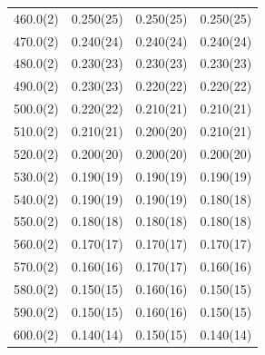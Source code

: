 \begin{longtable}{S[table-format=3.1(1)] S[table-format=3.3(3)] S[table-format=3.3(3)] S[table-format=3.3(3)]}
        460.0(2) & 0.250(25) & 0.250(25) & 0.250(25)\\ 
        470.0(2) & 0.240(24) & 0.240(24) & 0.240(24)\\ 
        480.0(2) & 0.230(23) & 0.230(23) & 0.230(23)\\ 
        490.0(2) & 0.230(23) & 0.220(22) & 0.220(22)\\ 
        500.0(2) & 0.220(22) & 0.210(21) & 0.210(21)\\ 
        510.0(2) & 0.210(21) & 0.200(20) & 0.210(21)\\ 
        520.0(2) & 0.200(20) & 0.200(20) & 0.200(20)\\ 
        530.0(2) & 0.190(19) & 0.190(19) & 0.190(19)\\ 
        540.0(2) & 0.190(19) & 0.190(19) & 0.180(18)\\ 
        550.0(2) & 0.180(18) & 0.180(18) & 0.180(18)\\ 
        560.0(2) & 0.170(17) & 0.170(17) & 0.170(17)\\ 
        570.0(2) & 0.160(16) & 0.170(17) & 0.160(16)\\ 
        580.0(2) & 0.150(15) & 0.160(16) & 0.150(15)\\ 
        590.0(2) & 0.150(15) & 0.160(16) & 0.150(15)\\ 
        600.0(2) & 0.140(14) & 0.150(15) & 0.140(14)     
    \end{longtable}

